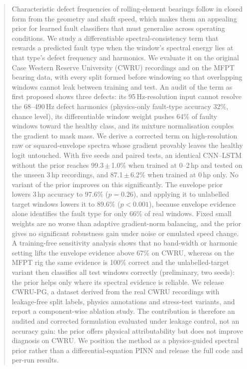 \documentclass[conference]{IEEEtran}
\begin{document}
\begin{abstract}
Characteristic defect frequencies of rolling-element bearings follow in closed
form from the geometry and shaft speed, which makes them an appealing prior for
learned fault classifiers that must generalise across operating conditions. We
study a differentiable spectral-consistency term that rewards a predicted
fault type when the window's spectral energy lies at that type's defect
frequency and harmonics. We evaluate it on the original Case Western Reserve
University (CWRU) recordings and on the MFPT bearing data, with every split
formed before windowing so that overlapping windows cannot leak between
training and test. An audit of the term as first proposed shows three defects:
its 95\,Hz-resolution input cannot resolve the 68--490\,Hz defect harmonics
(physics-only fault-type accuracy 32\%, chance level), its differentiable
window weight pushes 64\% of faulty windows toward the healthy class, and its
mixture normalisation couples the gradient to mask mass. We derive a corrected
term on high-resolution raw or squared-envelope spectra whose gradient provably
leaves the healthy logit untouched. With five seeds and paired tests, an
identical CNN--LSTM without the prior reaches 99.3\,$\pm$\,1.0\% when trained at
0--2\,hp and tested on the unseen 3\,hp recordings, and 87.1\,$\pm$\,6.2\% when
trained at 0\,hp only. No variant of the prior improves on this significantly.
The envelope prior lowers 3\,hp accuracy to 97.6\% ($p=0.26$), and applying it
to unlabelled target windows lowers it to 89.6\% ($p<0.001$), because envelope
evidence alone identifies the fault type for only 66\% of real windows. Fixed
small weights are no worse than adaptive gradient-norm balancing, and the prior
gives no significant robustness gain under noise or emulated speed change. A
training-free sensitivity analysis shows that no band-width or harmonic setting
lifts the envelope evidence above 67\% on CWRU, whereas on the MFPT rig the same
evidence is 100\% correct and the unlabelled-target variant then classifies all
test windows correctly (preliminary, two seeds): the prior helps only where its
spectral evidence is reliable. We release CWRU-PG, a dataset derived from the
real CWRU recordings with leakage-free split labels, physics annotations and
stress-test variants, and report a component-wise ablation study. The
contribution is therefore an audited and corrected formulation evaluated under
leakage control, not an accuracy gain: the prior offers physical attributability
but does not improve diagnosis on CWRU. We position the method as a
physics-guided spectral prior rather than a differential-equation PINN and
release the full code and per-run results.
\end{abstract}
\end{document}
